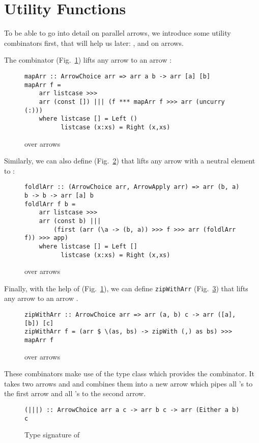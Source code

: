 \section{Utility Functions}\label{utilfns}
To be able to go into detail on parallel arrows, we introduce some utility combinators first, that will help us later: ,  and  on arrows.

The  combinator (Fig.~\ref{fig:mapArr}) lifts any arrow  to an arrow  \cite{programming_with_arrows}:
\begin{figure}[h]
\begin{lstlisting}[frame=htrbl]
mapArr :: ArrowChoice arr => arr a b -> arr [a] [b]
mapArr f =
	arr listcase >>>
	arr (const []) ||| (f *** mapArr f >>> arr (uncurry (:)))
	where listcase [] = Left ()
	      listcase (x:xs) = Right (x,xs)
\end{lstlisting}
\caption{ over arrows}
\label{fig:mapArr}
\end{figure}
Similarly, we can also define  (Fig.~\ref{fig:foldlArr}) that lifts any arrow  with a neutral element  to :
\begin{figure}[h]
\begin{lstlisting}[frame=htrbl]
foldlArr :: (ArrowChoice arr, ArrowApply arr) => arr (b, a) b -> b -> arr [a] b
foldlArr f b =
	arr listcase >>>
	arr (const b) |||
		(first (arr (\a -> (b, a)) >>> f >>> arr (foldlArr f)) >>> app)
	where listcase [] = Left []
	      listcase (x:xs) = Right (x,xs)
\end{lstlisting}
\caption{ over arrows}
\label{fig:foldlArr}
\end{figure}
Finally, with the help of  (Fig.~\ref{fig:mapArr}), we can define \lstinline{zipWithArr} (Fig.~\ref{fig:zipWithArr}) that lifts any arrow  to an arrow .
\begin{figure}[h]
\begin{lstlisting}[frame=htrbl]
zipWithArr :: ArrowChoice arr => arr (a, b) c -> arr ([a], [b]) [c]
zipWithArr f = (arr $ \(as, bs) -> zipWith (,) as bs) >>> mapArr f
\end{lstlisting}
\caption{ over arrows}
\label{fig:zipWithArr}
\end{figure}
These combinators make use of the  type class which provides the \code{(|||)} combinator. It takes two arrows  and  and combines them into a new arrow  which pipes all 's to the first arrow and all 's to the second arrow.
\begin{figure}[h]
\begin{lstlisting}[frame=htrbl]
(|||) :: ArrowChoice arr a c -> arr b c -> arr (Either a b) c
\end{lstlisting}
\caption{Type signature of \code{(|||)}}
\label{fig:codeSig|||}
\end{figure}


